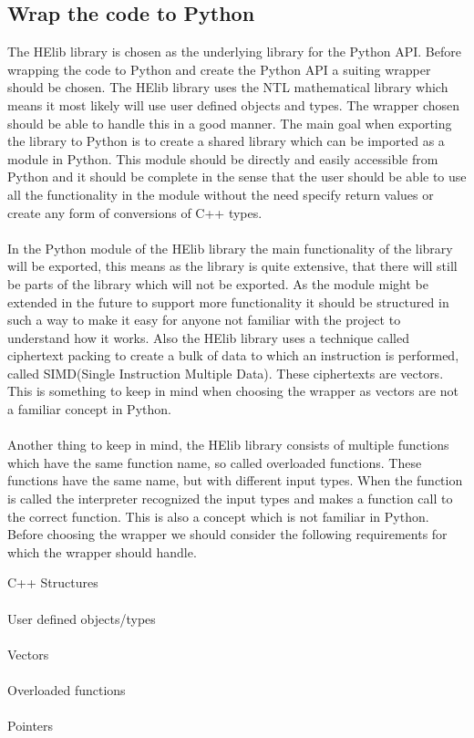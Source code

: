 \subsection{Wrap the code to Python}
The HElib library is chosen as the underlying library for the Python API. Before wrapping the code to Python and create the Python API a suiting wrapper should be chosen. The HElib library uses the NTL mathematical library which means it most likely will use user defined objects and types. The wrapper chosen should be able to handle this in a good manner. The main goal when exporting the library to Python is to create a shared library which can be imported as a module in Python. This module should be directly and easily accessible from Python and it should be complete in the sense that the user should be able to use all the functionality in the module without the need specify return values or create any form of conversions of C++ types.\\\\
In the Python module of the HElib library the main functionality of the library will be exported, this means as the library is quite extensive, that there will still be parts of the library which will not be exported. As the module might be extended in the future to support more functionality it should be structured in such a way to make it easy for anyone not familiar with the project to understand how it works.  Also the HElib library uses a technique called ciphertext packing to create a bulk of data to which an instruction is performed, called SIMD(Single Instruction Multiple Data). These ciphertexts are vectors. This is something to keep in mind when choosing the wrapper as vectors are not a familiar concept in Python. \\\\
Another thing to keep in mind, the HElib library consists of multiple functions which have the same function name, so called overloaded functions. These functions have the same name, but with different input types. When the function is called the interpreter recognized the input types and makes a function call to the correct function. This is also a concept which is not familiar in Python. Before choosing the wrapper we should consider the following requirements for which the wrapper should handle.

\textbullet C++ Structures\\\\
\textbullet User defined objects/types\\\\
\textbullet Vectors\\\\
\textbullet Overloaded functions\\\\
\textbullet Pointers\\

